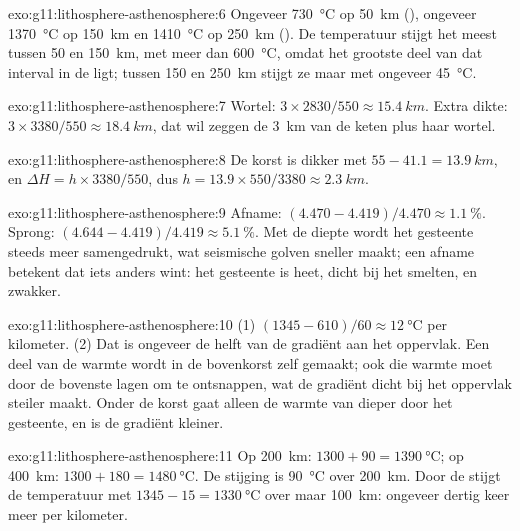 \begin{solution}{exo:g11:lithosphere-asthenosphere:6}
Ongeveer \qty{730}{\celsius} op \qty{50}{km} (), ongeveer
\qty{1370}{\celsius} op \qty{150}{km} en \qty{1410}{\celsius} op
\qty{250}{km} (). De temperatuur stijgt het meest tussen 50 en
\qty{150}{km}, met meer dan \qty{600}{\celsius}, omdat het grootste deel van dat
interval in de  ligt; tussen 150 en \qty{250}{km} stijgt ze maar
met ongeveer \qty{45}{\celsius}.
\end{solution}

\begin{solution}{exo:g11:lithosphere-asthenosphere:7}
Wortel: $3 \times 2830/550 \approx \qty{15.4}{km}$. Extra dikte:
$3 \times 3380/550 \approx \qty{18.4}{km}$, dat wil zeggen de \qty{3}{km} van de
keten plus haar wortel.
\end{solution}

\begin{solution}{exo:g11:lithosphere-asthenosphere:8}
De korst is dikker met $55 - 41.1 = \qty{13.9}{km}$, en $\Delta H = h
\times 3380/550$, dus $h = 13.9 \times 550/3380 \approx \qty{2.3}{km}$.
\end{solution}

\begin{solution}{exo:g11:lithosphere-asthenosphere:9}
Afname: $(4.470 - 4.419)/4.470 \approx \qty{1.1}{\percent}$. Sprong:
$(4.644 - 4.419)/4.419 \approx \qty{5.1}{\percent}$. Met de diepte wordt het
gesteente steeds meer samengedrukt, wat seismische golven sneller maakt; een
afname betekent dat iets anders wint: het gesteente is heet, dicht bij het
smelten, en zwakker.
\end{solution}

\begin{solution}{exo:g11:lithosphere-asthenosphere:10}
(1) $(1345 - 610)/60 \approx \qty{12}{\celsius}$ per kilometer. (2) Dat is
ongeveer de helft van de gradiënt aan het oppervlak. Een deel van de warmte
wordt in de bovenkorst zelf gemaakt; ook die warmte moet door de bovenste lagen
om te ontsnappen, wat de gradiënt dicht bij het oppervlak steiler maakt. Onder de
korst gaat alleen de warmte van dieper door het gesteente, en is de gradiënt kleiner.
\end{solution}

\begin{solution}{exo:g11:lithosphere-asthenosphere:11}
Op \qty{200}{km}: $1300 + 90 = \qty{1390}{\celsius}$; op \qty{400}{km}:
$1300 + 180 = \qty{1480}{\celsius}$. De stijging is \qty{90}{\celsius} over
\qty{200}{km}. Door de  stijgt de temperatuur met
$1345 - 15 = \qty{1330}{\celsius}$ over maar \qty{100}{km}: ongeveer dertig
keer meer per kilometer.
\end{solution}

